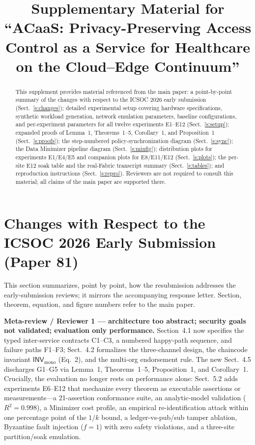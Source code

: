 \documentclass[runningheads]{llncs}
\begin{document}
\title{Supplementary Material for ``ACaaS: Privacy-Preserving Access Control as a Service for Healthcare on the Cloud--Edge Continuum''}

\maketitle

\begin{abstract}
This supplement provides material referenced from the main paper: a point-by-point summary of the changes with respect to the ICSOC 2026 early submission (Sect.~\ref{s:changes}); detailed experimental setup covering hardware specifications, synthetic workload generation, network emulation parameters, baseline configurations, and per-experiment parameters for all twelve experiments E1--E12 (Sect.~\ref{s:setup}); expanded proofs of Lemma~1, Theorems~1--5, Corollary~1, and Proposition~1 (Sect.~\ref{s:proofs}); the step-numbered policy-synchronization diagram (Sect.~\ref{s:sync}); the Data Minimizer pipeline diagram (Sect.~\ref{s:minfig}); distribution plots for experiments E1/E4/E5 and companion plots for E8/E11/E12 (Sect.~\ref{s:plots}); the per-site E12 soak table and the real-Fabric transcript summary (Sect.~\ref{s:tables}); and reproduction instructions (Sect.~\ref{s:repro}). Reviewers are not required to consult this material; all claims of the main paper are supported there.
\end{abstract}

\section{Changes with Respect to the ICSOC 2026 Early Submission (Paper 81)}
\label{s:changes}

This section summarizes, point by point, how the resubmission addresses the early-submission reviews; it mirrors the accompanying response letter. Section, theorem, equation, and figure numbers refer to the main paper.

\smallskip\noindent\textbf{Meta-review / Reviewer 1 --- architecture too abstract; security goals not validated; evaluation only performance.}
Section~4.1 now specifies the typed inter-service contracts \textsf{C1}--\textsf{C3}, a numbered happy-path sequence, and failure paths \textsf{F1}--\textsf{F3}; Sect.~4.2 formalizes the three-channel design, the chaincode invariant $\mathsf{INV}_{\mathrm{mono}}$ (Eq.~2), and the multi-org endorsement rule. The new Sect.~4.5 discharges G1--G5 via Lemma~1, Theorems~1--5, Proposition~1, and Corollary~1. Crucially, the evaluation no longer rests on performance alone: Sect.~5.2 adds experiments E6--E12 that mechanize every theorem as executable assertions or measurements---a 21-assertion conformance suite, an analytic-model validation ($R^2{=}0.998$), a Minimizer cost profile, an empirical re-identification attack within one percentage point of the $1/k$ bound, a ledger-vs-pub/sub tamper ablation, Byzantine fault injection ($f{=}1$) with zero safety violations, and a three-site partition/soak emulation.
\end{document}
